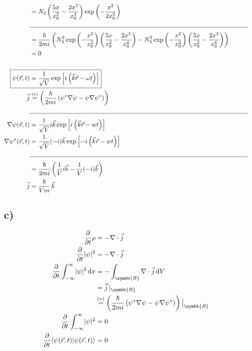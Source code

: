 \begin{align*}
        &= N_3 \left( \frac{5x}{x_0^2} - \frac{2x^3}{x_0^4} \right) \exp \left( -\frac{x^2}{2x_0^2} \right)\\
        &\text{\noindent\makebox[\linewidth]{\rule{\linewidth}{0.4pt}}}\\
        &= \frac{\hbar}{2mi} \left( N_3^2 \exp \left( -\frac{x^2}{x_0^2} \right) \left( \frac{5x}{x_0^2} - \frac{2x^3}{x_0^4} \right) - N_3^2 \exp \left( -\frac{x^2}{x_0^2} \right) \left( \frac{5x}{x_0^2} - \frac{2x^3}{x_0^4} \right) \right)\\
        &= 0\\
        \\
        \Aboxed{\psi(\vec{r}, t) &= \frac{1}{\sqrt{V}} \exp \left[ i \left( \vec{k} \vec{r} - \omega t \right) \right]}\\
        \vec{j} &\stackrel{(*)}{=} \left( \frac{\hbar}{2mi} \left( \psi^* \nabla \psi - \psi \nabla \psi^* \right) \right)\\
        &\text{\noindent\makebox[\linewidth]{\rule{\linewidth}{0.4pt}}}\\
        \nabla \psi(\vec{r}, t) &= \frac{1}{\sqrt{V}} i\vec{k} \exp \left[ i \left( \vec{k} \vec{r} - wt \right) \right]\\
        \nabla \psi^*(\vec{r}, t) &= \frac{1}{\sqrt{V}} (-i)\vec{k} \exp \left[ -i \left( \vec{k} \vec{r} - wt \right) \right]\\
        &\text{\noindent\makebox[\linewidth]{\rule{\linewidth}{0.4pt}}}\\
        &= \frac{\hbar}{2mi} \left( \frac{1}{V} i\vec{k} - \frac{1}{V} (-i)\vec{k} \right)\\
        \vec{j} &= \frac{\hbar}{Vm}\, \vec{k}
    \end{align*}

\newpage
\subsection{c)}

    \begin{align*}
        \frac{\partial}{\partial t} \rho &= -\nabla \cdot \vec{j}\\
        \frac{\partial}{\partial t} \abs{\psi}^2 &= - \nabla \cdot \vec{j}\\
        \frac{\partial}{\partial t} \int_{-\infty}^{\infty}  \abs{\psi}^2 \,\mathrm{d}x &= -\int_{\symbb{R}} \nabla \cdot \vec{j} \,\mathrm{d}V\\
        &= \vec{j}\, \vert_{\symbb{R}}\\
        &\stackrel{(*)}{=} \left( \frac{\hbar}{2mi} \left( \psi^* \nabla \psi - \psi \nabla \psi^*   \right) \right) \big| _{\symbb{R}}\\
        \frac{\partial}{\partial t} \int_{-\infty}^{\infty} \abs{\psi}^2 &= 0\\
        \frac{\partial}{\partial t} \langle \psi(\vec{r}, t) \vert \psi(\vec{r}, t) \rangle &= 0
    \end{align*}

